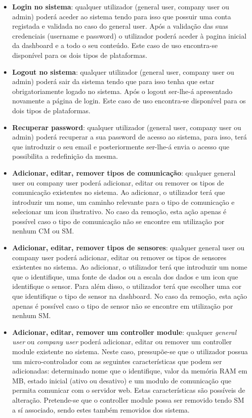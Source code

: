 \begin{itemize}
	\item \textbf{Login no sistema}: qualquer utilizador (general user, company user ou admin) poderá aceder ao sistema tendo para isso que possuir uma conta registada e validada no caso do general user. Após a validação das suas credenciais (username e password) o utilizador poderá aceder à pagina inicial da dashboard e a todo o seu conteúdo. Este caso de uso encontra-se disponível para os dois tipos de plataformas. 
	
	
	\item \textbf{Logout no sistema}: qualquer utilizador (general user, company user ou admin) poderá sair da sistema tendo que para isso tenha que estar obrigatoriamente logado no sistema. Após o logout ser-lhe-á apresentado novamente a página de login. Este caso de uso encontra-se disponível para os dois tipos de plataformas. 
	
	
	\item \textbf{Recuperar password}: qualquer utilizador (general user, company user ou admin) poderá recuperar a sua password de acesso ao sistema, para isso, terá que introduzir o seu email e posteriormente ser-lhe-á envia o acesso que possibilita a redefinição da mesma. 
	
	
	
	\item \textbf{Adicionar, editar, remover tipos de comunicação}: qualquer general user ou company user poderá adicionar, editar ou remover os tipos de comunicação existentes no sistema. Ao  adicionar, o utilizador terá que introduzir um nome, um caminho relevante para o tipo de comunicação e selecionar um icon ilustrativo. No caso da remoção, esta ação apenas é possível caso o tipo de comunicação não se encontre em utilização por nenhum \ac{CM} ou \ac{SM}.  
	
	\item \textbf{Adicionar, editar, remover tipos de sensores}: qualquer general user ou company user poderá adicionar, editar ou remover os tipos de sensores existentes no sistema. Ao  adicionar, o utilizador terá que introduzir um nome que o identifique, uma fonte de dados ou a escala dos dados  e um icon que identifique o sensor. Para além disso, o utilizador terá que escolher uma cor que identifique o tipo de sensor na dashboard. No caso da remoção, esta ação apenas é possível caso o tipo de sensor não se encontre em utilização por nenhum \ac{SM}.   
	 
	
	\item \textbf{Adicionar, editar, remover um controller module}: qualquer \textit{general user} ou \textit{company user} poderá adicionar, editar ou remover um controller module existente no sistema. Neste caso, pressupõe-se que o utilizador possua um micro-controlador com as seguintes características que podem ser adicionadas: determinado nome que o identifique, valor da memória RAM em MB, estado inicial (ativo ou desativo) e um modulo de comunicação que permita comunicar com o servidor web. Estas características são possíveis de alteração. Pretende-se que o controller module possa ser removido tendo \ac{SM} a sí associado, sendo estes também removidos dos sistema. 



\end{itemize}

